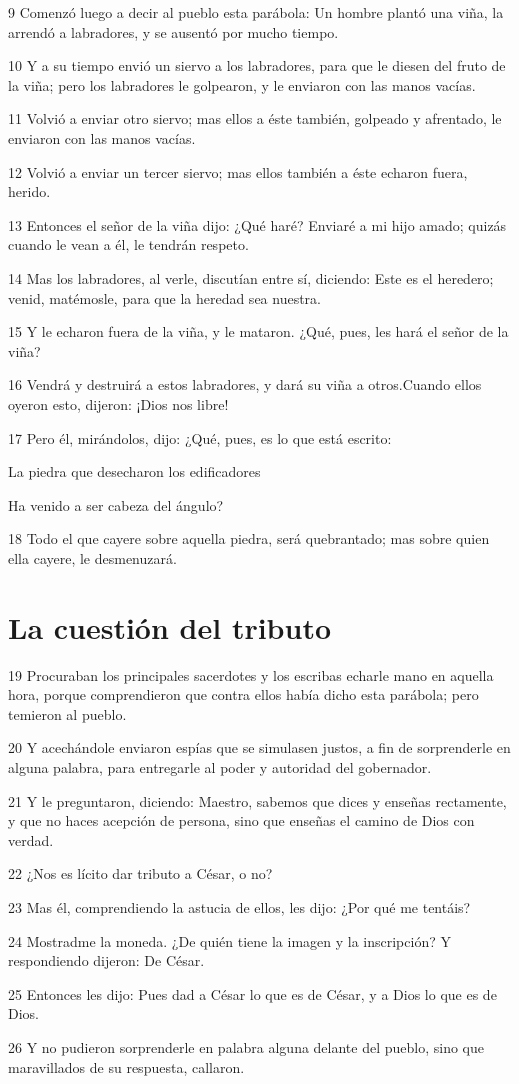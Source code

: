 \par 9 Comenzó luego a decir al pueblo esta parábola: Un hombre plantó una viña, la arrendó a labradores, y se ausentó por mucho tiempo.
\par 10 Y a su tiempo envió un siervo a los labradores, para que le diesen del fruto de la viña; pero los labradores le golpearon, y le enviaron con las manos vacías.
\par 11 Volvió a enviar otro siervo; mas ellos a éste también, golpeado y afrentado, le enviaron con las manos vacías.
\par 12 Volvió a enviar un tercer siervo; mas ellos también a éste echaron fuera, herido.
\par 13 Entonces el señor de la viña dijo: ¿Qué haré? Enviaré a mi hijo amado; quizás cuando le vean a él, le tendrán respeto.
\par 14 Mas los labradores, al verle, discutían entre sí, diciendo: Este es el heredero; venid, matémosle, para que la heredad sea nuestra.
\par 15 Y le echaron fuera de la viña, y le mataron. ¿Qué, pues, les hará el señor de la viña?
\par 16 Vendrá y destruirá a estos labradores, y dará su viña a otros.Cuando ellos oyeron esto, dijeron: ¡Dios nos libre!
\par 17 Pero él, mirándolos, dijo: ¿Qué, pues, es lo que está escrito:
\par La piedra que desecharon los edificadores
\par Ha venido a ser cabeza del ángulo?
\par 18 Todo el que cayere sobre aquella piedra, será quebrantado; mas sobre quien ella cayere, le desmenuzará.

\section*{La cuestión del tributo}

\par 19 Procuraban los principales sacerdotes y los escribas echarle mano en aquella hora, porque comprendieron que contra ellos había dicho esta parábola; pero temieron al pueblo.
\par 20 Y acechándole enviaron espías que se simulasen justos, a fin de sorprenderle en alguna palabra, para entregarle al poder y autoridad del gobernador.
\par 21 Y le preguntaron, diciendo: Maestro, sabemos que dices y enseñas rectamente, y que no haces acepción de persona, sino que enseñas el camino de Dios con verdad.
\par 22 ¿Nos es lícito dar tributo a César, o no?
\par 23 Mas él, comprendiendo la astucia de ellos, les dijo: ¿Por qué me tentáis?
\par 24 Mostradme la moneda. ¿De quién tiene la imagen y la inscripción? Y respondiendo dijeron: De César.
\par 25 Entonces les dijo: Pues dad a César lo que es de César, y a Dios lo que es de Dios.
\par 26 Y no pudieron sorprenderle en palabra alguna delante del pueblo, sino que maravillados de su respuesta, callaron.

